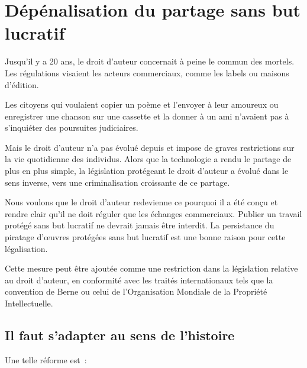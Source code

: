 \chapter{Dépénalisation du partage sans but lucratif}\label{depen}

Jusqu’il y a 20 ans, le droit d’auteur concernait à peine le commun des mortels. Les régulations
visaient les acteurs commerciaux, comme les labels ou maisons d’édition.

Les citoyens qui voulaient copier un poème et l’envoyer à leur amoureux ou enregistrer une chanson
sur une cassette et la donner à un ami n’avaient pas à s’inquiéter des poursuites judiciaires.

Mais le droit d'auteur n'a pas évolué depuis et impose de graves restrictions sur
la vie quotidienne des individus. Alors que la technologie a rendu le partage de plus en plus
simple, la législation protégeant le droit d'auteur a évolué dans le sens inverse, vers une criminalisation croissante de ce
partage.

\begin{mesure}
 Nous voulons que le droit d’auteur redevienne ce pourquoi il a été conçu et rendre clair qu’il ne
doit réguler que les échanges commerciaux. Publier un travail protégé sans but lucratif
ne devrait jamais être interdit. La persistance du piratage d'œuvres protégées sans but lucratif est une bonne raison pour cette
légalisation.
\end{mesure}

Cette mesure peut être ajoutée comme une restriction dans la législation
relative au droit d’auteur, en conformité avec les traités internationaux tels que la convention de
Berne ou celui de
l’Organisation Mondiale de la Propriété
Intellectuelle.

\section{Il faut s'adapter au sens de l'histoire}

Une telle réforme est~:

